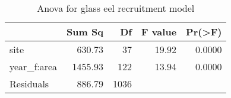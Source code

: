 \begin{table}[htbp]
\centering
\caption[table_anova]{Anova for glass eel recruitment model} 
\begin{tabularx}{0.8\textwidth}{lrrrr}
  \hline
 & Sum Sq & Df & F value & Pr(>F) \\ 
  \hline
site & 630.73 & 37 & 19.92 & 0.0000 \\ 
  year\_f:area & 1455.93 & 122 & 13.94 & 0.0000 \\ 
  Residuals & 886.79 & 1036 &  &  \\ 
   \hline
\end{tabularx}
\end{table}
